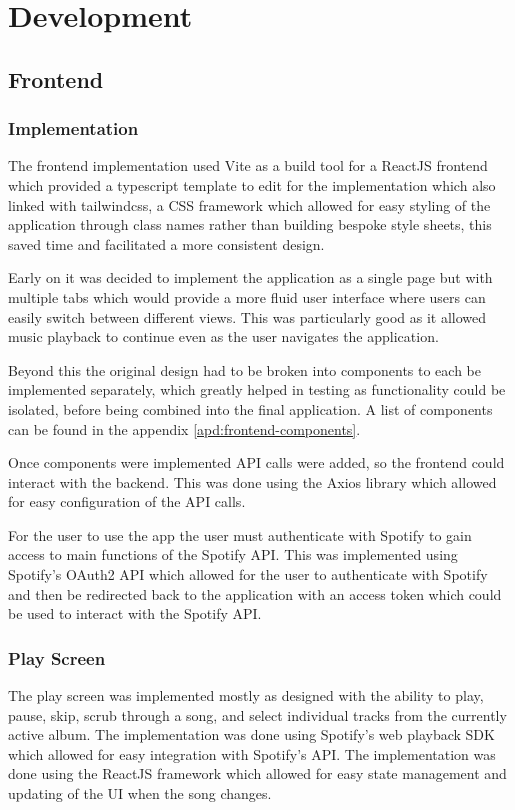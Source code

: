 \chapter{Development}
\label{cha:development}

\section{Frontend}
\subsection{Implementation}
The frontend implementation used Vite as a build tool for a ReactJS frontend which provided a typescript template to edit for the implementation which also linked with tailwindcss, a CSS framework which allowed for easy styling of the application through class names rather than building bespoke style sheets, this saved time and facilitated a more consistent design.

Early on it was decided to implement the application as a single page but with multiple tabs which would provide a more fluid user interface where users can easily switch between different views. This was particularly good as it allowed music playback to continue even as the user navigates the application.

Beyond this the original design had to be broken into components to each be implemented separately, which greatly helped in testing as functionality could be isolated, before being combined into the final application. A list of components can be found in the appendix \ref{apd:frontend-components}.

Once components were implemented API calls were added, so the frontend could interact with the backend. This was done using the Axios library which allowed for easy configuration of the API calls.

For the user to use the app the user must authenticate with Spotify to gain access to main functions of the Spotify API. This was implemented using Spotify's OAuth2 API which allowed for the user to authenticate with Spotify and then be redirected back to the application with an access token which could be used to interact with the Spotify API.

\subsection{Play Screen}
The play screen was implemented mostly as designed with the ability to play, pause, skip, scrub through a song, and select individual tracks from the currently active album. The implementation was done using Spotify's web playback SDK which allowed for easy integration with Spotify's API. The implementation was done using the ReactJS framework which allowed for easy state management and updating of the UI when the song changes.
